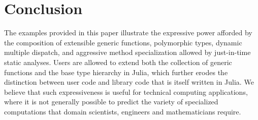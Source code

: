\documentclass[10pt, preprint]{sigplanconf}
\begin{document}







\section{Conclusion}

The examples provided in this paper illustrate the expressive power afforded by
the composition of extensible generic functions, polymorphic types,
dynamic multiple dispatch, and aggressive method specialization allowed by
just-in-time static analyses. Users are allowed to extend both the collection
of generic functions and the base type hierarchy in Julia, which further erodes
the distinction between user code and library code that is itself written in
Julia. We believe that such expressiveness is useful for technical computing
applications, where it is not generally possible to predict the variety of
specialized computations that domain scientists, engineers and mathematicians
require.
\end{document}

